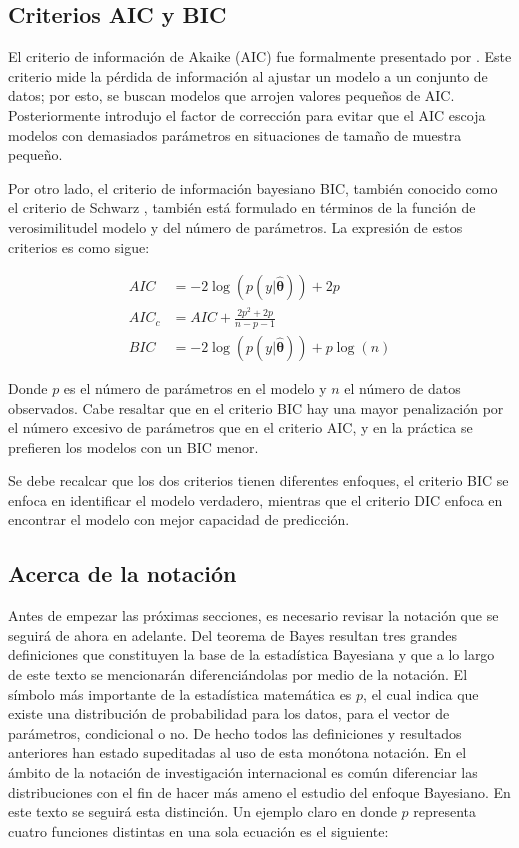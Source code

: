 \documentclass[
  spanish,
]{book}
\theoremstyle{definition}
\theoremstyle{definition}
\theoremstyle{definition}
\theoremstyle{remark}
\begin{document}
\hypertarget{criterios-aic-y-bic}{%
\subsection{Criterios AIC y BIC}\label{criterios-aic-y-bic}}

El criterio de información de Akaike (AIC) fue formalmente presentado por \citet{Akaike}. Este criterio mide la pérdida de información al
ajustar un modelo a un conjunto de datos; por esto, se buscan modelos
que arrojen valores pequeños de AIC. Posteriormente \citep{AICc}
introdujo el factor de corrección para evitar que el AIC escoja modelos
con demasiados parámetros en situaciones de tamaño de muestra pequeño.

Por otro lado, el criterio de información bayesiano BIC, también
conocido como el criterio de Schwarz \citep{Schwarz}, también está
formulado en términos de la función de verosimilitudel modelo y del
número de parámetros. La expresión de estos criterios es como sigue:

\begin{align*}
AIC&=-2\log(p(y|\hat{\boldsymbol \theta}))+2p\\
AIC_c&=AIC+\frac{2p^2+2p}{n-p-1}\\
BIC&=-2\log(p(y|\hat{\boldsymbol \theta}))+p\log(n)
\end{align*}

Donde \(p\) es el número de parámetros en el modelo y \(n\) el número de
datos observados. Cabe resaltar que en el criterio BIC hay una mayor
penalización por el número excesivo de parámetros que en el criterio
AIC, y en la práctica se prefieren los modelos con un BIC menor.

Se debe recalcar que los dos criterios tienen diferentes
enfoques, el criterio BIC se enfoca en identificar el modelo verdadero,
mientras que el criterio DIC enfoca en encontrar el modelo con mejor
capacidad de predicción.

\hypertarget{acerca-de-la-notaciuxf3n}{%
\subsection{Acerca de la notación}\label{acerca-de-la-notaciuxf3n}}

Antes de empezar las próximas secciones, es necesario revisar la
notación que se seguirá de ahora en adelante. Del teorema de Bayes
resultan tres grandes definiciones que constituyen la base de la
estadística Bayesiana y que a lo largo de este texto se mencionarán
diferenciándolas por medio de la notación. El símbolo más importante de
la estadística matemática es \(p\), el cual indica que existe una
distribución de probabilidad para los datos, para el vector de
parámetros, condicional o no. De hecho todos las definiciones y
resultados anteriores han estado supeditadas al uso de esta monótona
notación. En el ámbito de la notación de investigación internacional es
común diferenciar las distribuciones con el fin de hacer más ameno el
estudio del enfoque Bayesiano. En este texto se seguirá esta distinción.
Un ejemplo claro en donde \(p\) representa cuatro funciones distintas en
una sola ecuación es el siguiente:
\end{document}

